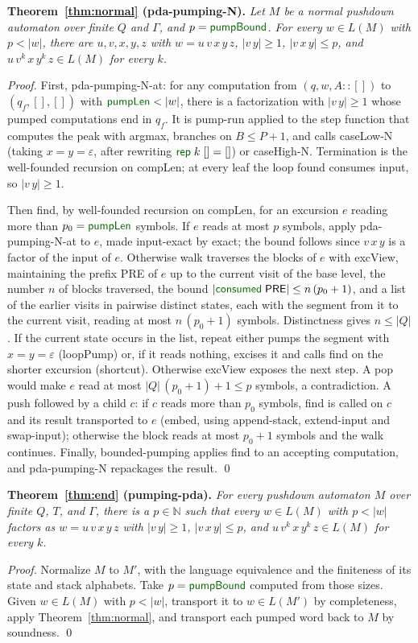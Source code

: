 \documentclass[runningheads]{llncs}
\newcommand{\greenFG}[1]{\textcolor[rgb]{0,0.4,0}{#1}}
\newcommand{\F}[1]{{\greenFG{\textsf{#1}}}}     %
\newcommand{\kG}{\ensuremath{\Gamma}}   %
\newcommand{\knat}{\ensuremath{\mathbb{N}}}
\begin{document}
\medskip
\noindent\textbf{Theorem~\ref{thm:normal} (\F{pda-pumping-N}).}
\emph{Let $M$ be a normal pushdown automaton over finite $Q$ and $\kG$, and
$p = \F{pumpBound}$. For every $w \in L(M)$ with $p < |w|$, there are
$u,v,x,y,z$ with $w = u\,v\,x\,y\,z$, $|v\,y| \geq 1$, $|v\,x\,y| \leq p$, and
$u\,v^{k}\,x\,y^{k}\,z \in L(M)$ for every $k$.}
\begin{proof}
First, \F{pda-pumping-N-at}: for any computation from
$(q, w, A :: [])$ to $(q_f, [], [])$ with $\F{pumpLen} < |w|$, there is a factorization with
$|v\,y| \geq 1$ whose pumped computations end in $q_f$. It is \F{pump-run} applied
to the step function that computes the peak with \F{argmax}, branches on
$B \leq P+1$, and calls \F{caseLow-N} (taking $x = y = \varepsilon$, after
rewriting $\F{rep}\;k\;[] = []$) or \F{caseHigh-N}. Termination is the
well-founded recursion on \F{compLen}; at every leaf the loop found consumes
input, so $|v\,y| \geq 1$.

Then \F{find}, by well-founded recursion on \F{compLen}, for an excursion $e$
reading more than $p_0 = \F{pumpLen}$ symbols. If $e$ reads at most $p$ symbols,
apply \F{pda-pumping-N-at} to $e$, made input-exact by \F{exact}; the bound
follows since $v\,x\,y$ is a factor of the input of $e$. Otherwise \F{walk}
traverses the blocks of $e$ with \F{excView}, maintaining the prefix
\textsf{PRE} of $e$ up to the current visit of the base level, the number $n$ of
blocks traversed, the bound $|\F{consumed}\;\textsf{PRE}| \leq n\,(p_0+1)$, and
a list of the earlier visits in pairwise distinct states, each with the segment
from it to the current visit, reading at most $n\,(p_0+1)$ symbols. Distinctness
gives $n \leq |Q|$. If the current state occurs in the list, \F{repeat} either
pumps the segment with $x = y = \varepsilon$ (\F{loopPump}) or, if it reads
nothing, excises it and calls \F{find} on the shorter excursion
(\F{shortcut}). Otherwise \F{excView} exposes the next step. A pop would make
$e$ read at most $|Q|\,(p_0+1)+1 \leq p$ symbols, a contradiction. A push
followed by a child $c$: if $c$ reads more than $p_0$ symbols, \F{find} is called
on $c$ and its result transported to $e$ (\F{embed}, using \F{append-stack},
\F{extend-input} and \F{swap-input}); otherwise the block reads at most $p_0 + 1$
symbols and the walk continues. Finally, \F{bounded-pumping} applies \F{find} to
an accepting computation, and \F{pda-pumping-N} repackages the result. \qed
\end{proof}

\medskip
\noindent\textbf{Theorem~\ref{thm:end} (\F{pumping-pda}).}
\emph{For every pushdown automaton $M$ over finite $Q$, $T$, and $\kG$, there
is a $p \in \knat$ such that every $w \in L(M)$ with $p < |w|$ factors as
$w = u\,v\,x\,y\,z$ with $|v\,y| \geq 1$, $|v\,x\,y| \leq p$, and
$u\,v^{k}\,x\,y^{k}\,z \in L(M)$ for every $k$.}
\begin{proof}
Normalize $M$ to $M'$, with the language equivalence and the finiteness of its
state and stack alphabets. Take $p = \F{pumpBound}$ computed from those sizes.
Given $w \in L(M)$ with $p < |w|$, transport it to $w \in L(M')$ by
completeness, apply Theorem~\ref{thm:normal}, and transport each pumped word back
to $M$ by soundness. \qed
\end{proof}
\end{document}

